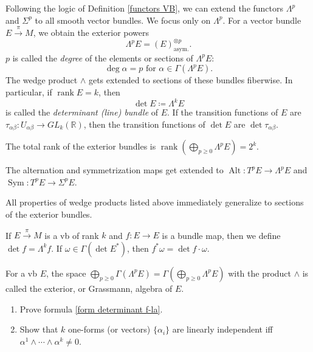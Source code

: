 \documentclass[english,letterpaper]{article}%
\numberwithin{equation}{section}
\numberwithin{figure}{section}
\numberwithin{table}{section}
\theoremstyle{definition}
\theoremstyle{definition}
\theoremstyle{definition}
\theoremstyle{plain}
\theoremstyle{plain}
\theoremstyle{plain}
\theoremstyle{plain}
\theoremstyle{remark}
\theoremstyle{remark}
\renewcommand{\geq}{\geqslant}
\DeclareMathOperator{\rank}{rank}
\DeclareMathOperator{\Alt}{Alt}
\DeclareMathOperator{\Sym}{Sym}
\begin{document}
\begin{defn}
Following the logic of Definition \ref{functors VB}, we can extend the functors $\Lambda^p$ and $\Sigma^p$ to all smooth vector bundles. We focus only on $\Lambda^p$. For a vector bundle $E\overset{\pi}{\to} M$, we obtain the exterior powers
\[\Lambda^p E=(E)^{\otimes p}_{\text{asym.}}.\]
$p$ is called the \emph{degree} of the elements or sections of $\Lambda^p E$: \[\deg \alpha=p\text{ for }\alpha\in\Gamma(\Lambda^p E).\]
The wedge product $\wedge$ gets extended to sections of these bundles fiberwise.
In particular, if $\rank E=k$, then \[\det E\coloneqq \Lambda^k E\] is called the \emph{determinant (line) bundle} of $E$. If the transition functions of $E$ are $\tau_{\alpha\beta}:U_{\alpha\beta}\to GL_k(\mathbb{R})$, then the transition functions of $\det E$ are $\det \tau_{\alpha\beta}$.

The total rank of the exterior bundles is $\rank \left(\bigoplus_{p\geq 0}\Lambda^p E\right)=2^k.$

The alternation and symmetrization maps get extended to $\Alt: T^p E\to \Lambda^p E$ and $\Sym:T^p E\to \Sigma^p E$.
\end{defn}

All properties of wedge products listed above immediately generalize to sections of the exterior bundles.

\begin{defn}
If $E\overset\pi\to M$ is a \gls{vb} of rank $k$ and $f:E\to E$ is a bundle map, then we define $\det f=\Lambda^k f$. If $\omega\in\Gamma(\det E^\ast)$, then $f^\ast \omega=\det f\cdot \omega$.
\end{defn}

\begin{defn}
For a \gls{vb} $E$, the space $\bigoplus_{p\geq 0}\Gamma(\Lambda^p E)=\Gamma\left(\bigoplus_{p\geq 0}\Lambda^p E\right)$ with the product $\wedge$ is called the exterior, or Grassmann, algebra of $E$.
\end{defn}

\begin{xca}
    \begin{enumerate}
        \item Prove formula \ref{form determinant f-la}.
        \item Show that $k$ one-forms (or vectors) $\{\alpha_i\}$ are linearly independent iff $\alpha^1\wedge\cdots\wedge\alpha^k\neq 0$. 
    \end{enumerate}
\end{xca}
\end{document}
